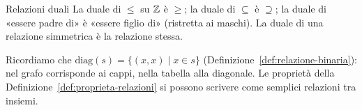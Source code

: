 
\begin{esempio}{Relazioni duali}
    La duale di $\leq$ su $\mathbb{Z}$ è $\geq$; la duale di $\subseteq$ è $\supseteq$; la duale di «essere padre di» è «essere figlio di»
    (ristretta ai maschi). La duale di una relazione simmetrica è la relazione stessa.
\end{esempio}

Ricordiamo che $\mathrm{diag}(s) = \{(x, x) \mid x \in s\}$ (Definizione~\ref{def:relazione-binaria}): nel grafo corrisponde
ai cappi, nella tabella alla diagonale. Le proprietà della Definizione~\ref{def:proprieta-relazioni} si possono scrivere come
semplici relazioni tra insiemi.


